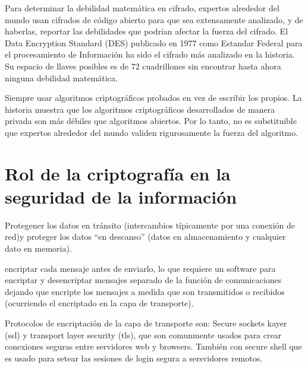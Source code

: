 Para determinar la debilidad matemática en cifrado, expertos alrededor del mundo usan cifrados de código abierto para que sea extensamente analizado, y de haberlas, reportar las debilidades que podrían afectar la fuerza del cifrado. El Data Encryption Standard (DES) publicado en 1977 como Estandar Federal para el procesamiento de Información ha sido el cifrado más analizado en la historia. Su espacio de llaves posibles es de 72 cuadrillones sin encontrar hasta ahora ninguna debilidad matemática. 



\begin{tcolorbox}[colback=gray!5!white,colframe=red!60!gray,title= ADVERTENCIA]
Siempre usar algoritmos criptográficos probados en vez de escribir los propios. La historia muestra que los algoritmos criptográficos desarrollados de manera privada son más débiles que algoritmos abiertos. Por lo tanto, no es substituible que expertos alrededor del mundo validen rigurosamente la fuerza del algoritmo.
\end{tcolorbox}

\section{Rol de la criptografía en la seguridad de la información}


\begin{tcolorbox}[colback=gray!5!white,colframe=orange!60!gray,title= Usos]
Protegener los datos en tránsito (intercambios típicamente por una conexión de red)y proteger los datos ``en descanso'' (datos en almacenamiento y cualquier dato en memoria).
\end{tcolorbox}

\begin{tcolorbox}[colback=gray!5!white,colframe=orange!60!gray,title= Enfoques para asegurar las comunicaciones]
encriptar cada mensaje antes de enviarlo, lo que requiere un software para encriptar y desencriptar mensajes separado de la función de comunicaciones dejando que encripte los mensajes a medida que son transmitidos o recibidos (ocurriendo el encriptado en la capa de transporte).  
\end{tcolorbox}

\begin{tcolorbox}[colback=gray!5!white,colframe=orange!60!gray,title= SSL/TLSs]
Protocolos de encriptación de la capa de transporte son: Secure sockets kayer (ssl) y transport layer security (tls), que son comunmente usados para crear conexiones seguras entre servidores web y browsers. También con secure shell que es usado para setear las sesiones de login segura a sersvidores remotos.  
\end{tcolorbox}

